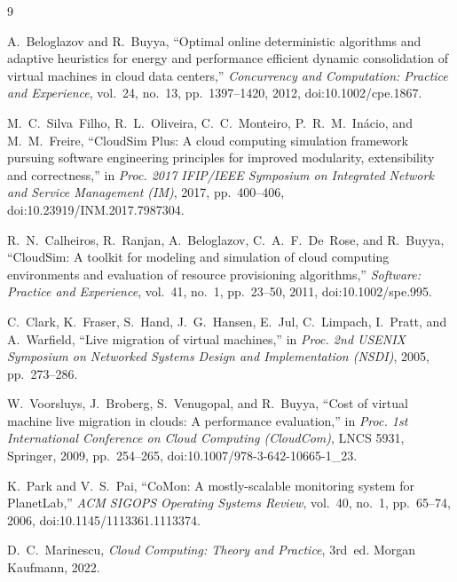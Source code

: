 \documentclass[11pt,a4paper]{article}
\begin{document}
\begin{thebibliography}{9}
\small
\setlength{\itemsep}{0.25\baselineskip}

A.~Beloglazov and R.~Buyya, ``Optimal online deterministic algorithms and adaptive heuristics for energy and performance efficient dynamic consolidation of virtual machines in cloud data centers,'' \emph{Concurrency and Computation: Practice and Experience}, vol.~24, no.~13, pp.~1397--1420, 2012, doi:10.1002/cpe.1867.

M.~C.~Silva~Filho, R.~L.~Oliveira, C.~C.~Monteiro, P.~R.~M.~In\'acio, and M.~M.~Freire, ``CloudSim Plus: A cloud computing simulation framework pursuing software engineering principles for improved modularity, extensibility and correctness,'' in \emph{Proc. 2017 IFIP/IEEE Symposium on Integrated Network and Service Management (IM)}, 2017, pp.~400--406, doi:10.23919/INM.2017.7987304.

R.~N.~Calheiros, R.~Ranjan, A.~Beloglazov, C.~A.~F.~De~Rose, and R.~Buyya, ``CloudSim: A toolkit for modeling and simulation of cloud computing environments and evaluation of resource provisioning algorithms,'' \emph{Software: Practice and Experience}, vol.~41, no.~1, pp.~23--50, 2011, doi:10.1002/spe.995.

C.~Clark, K.~Fraser, S.~Hand, J.~G.~Hansen, E.~Jul, C.~Limpach, I.~Pratt, and A.~Warfield, ``Live migration of virtual machines,'' in \emph{Proc. 2nd USENIX Symposium on Networked Systems Design and Implementation (NSDI)}, 2005, pp.~273--286.

W.~Voorsluys, J.~Broberg, S.~Venugopal, and R.~Buyya, ``Cost of virtual machine live migration in clouds: A performance evaluation,'' in \emph{Proc. 1st International Conference on Cloud Computing (CloudCom)}, LNCS 5931, Springer, 2009, pp.~254--265, doi:10.1007/978-3-642-10665-1\_23.

K.~Park and V.~S.~Pai, ``CoMon: A mostly-scalable monitoring system for PlanetLab,'' \emph{ACM SIGOPS Operating Systems Review}, vol.~40, no.~1, pp.~65--74, 2006, doi:10.1145/1113361.1113374.

D.~C.~Marinescu, \emph{Cloud Computing: Theory and Practice}, 3rd~ed. Morgan Kaufmann, 2022.

\end{thebibliography}
\end{document}
